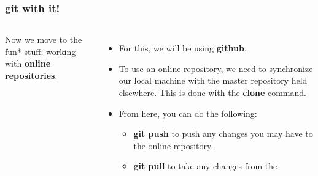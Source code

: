 \documentclass{beamer}
\begin{document}
\begin{frame}
\frametitle{\textbf{git} with it!}
\begin{columns}
Now we move to the fun* stuff: working with \textbf{online repositories}.
\begin{itemize}
\item For this, we will be using \textbf{github}. 
\item To use an online repository, we need to synchronize our local machine with the master repository held elsewhere. This is done with the \textbf{clone} command.
\item From here, you can do the following:
\begin{itemize}
\item \textbf{git push} to push any changes you may have to the online repository.
\item \textbf{git pull} to take any changes from the 
\end{itemize}
\end{itemize}

\end{columns}
\end{frame}
\end{document}

